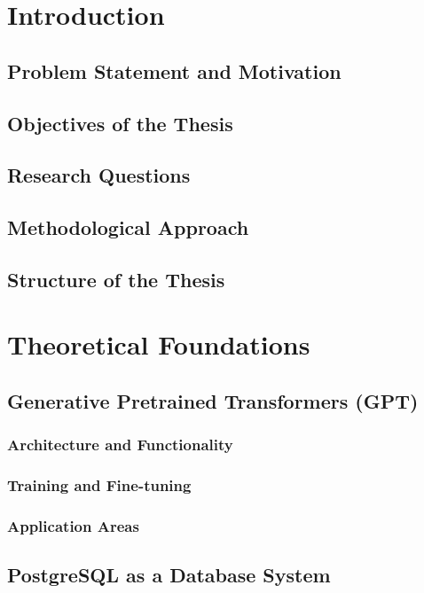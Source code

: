 \documentclass{article}
\begin{document}
\newpage

\section{Introduction}
\subsection{Problem Statement and Motivation}
\subsection{Objectives of the Thesis}
\subsection{Research Questions}
\subsection{Methodological Approach}
\subsection{Structure of the Thesis}

\newpage

\section{Theoretical Foundations}

\subsection{Generative Pretrained Transformers (GPT)}
\subsubsection{Architecture and Functionality}
\subsubsection{Training and Fine-tuning}
\subsubsection{Application Areas}

\subsection{PostgreSQL as a Database System}
\end{document}
